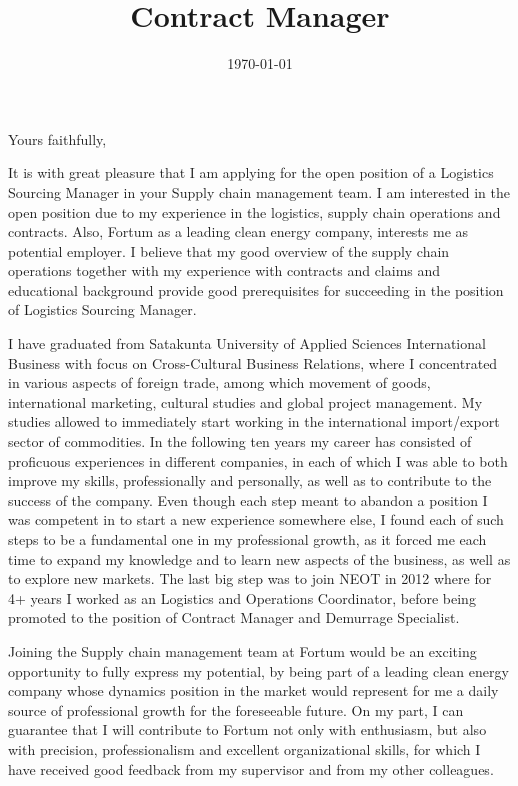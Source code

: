 \documentclass[11pt,a4paper,sans]{moderncv}        %
\title{Contract Manager}                               %
\begin{document}
\date{\today}
\closing{Yours faithfully,}
\makelettertitle

\hspace*{-5cm}

It is with great pleasure that I am applying for the open position of a Logistics Sourcing Manager in your Supply chain management team.
I am interested in the open position due to my experience in the logistics, supply chain operations and contracts. Also, Fortum as a leading clean energy company, interests me as potential employer. I
believe that my good overview of the supply chain operations together with my experience with contracts and claims and
educational background provide good prerequisites for succeeding in the position of Logistics Sourcing Manager.
 
 
I have graduated from Satakunta University of Applied Sciences International Business with focus on
Cross-Cultural Business Relations, where I concentrated in various aspects of foreign trade, among which  movement of goods, international marketing, cultural studies and
global project management. My studies allowed to immediately start working in the international import/export sector
of commodities. In the following ten years my career has consisted of proficuous experiences in different companies, in each of which
I was able to both improve my skills, professionally and personally, as well as to contribute to the success of the company. Even though
each step meant to abandon a position I was competent in to start a new experience somewhere else, I found each of such steps to be a fundamental
one in my professional growth, as it forced me each time to expand my knowledge and to learn new aspects of the business, as well as to
explore new markets. The last big step was to join NEOT in 2012 where for 4+ years I worked as an Logistics
and Operations Coordinator, before being promoted to the position of Contract Manager and Demurrage Specialist.
 
Joining the Supply chain management team at Fortum would be an exciting opportunity to fully express my potential, by being
part of a leading clean energy company whose dynamics position in the market would represent for me a daily source of professional
growth for the foreseeable future.
On my part, I can guarantee that I will contribute to Fortum not only with enthusiasm, but also with precision, professionalism
and excellent organizational skills, for which I have received good feedback from my supervisor and from my other
colleagues.
\\

\makeletterclosing
\end{document}

